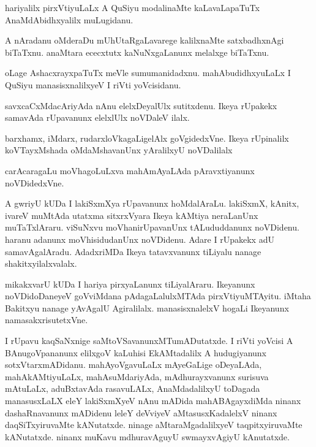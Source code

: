 \documentclass{article}
\begin{document}
\begin{mn}%
hariyalilx pirxVtiyuLaLx A QuSiyu modalinaMte kaLavaLapaTuTx AnaMdAbidhxyalilx muLugidanu.
\end{mn}

\begin{mn}%
A nAradanu oMderaDu mUhUtaRgaLavarege kalilxnaMte satxbadhxnAgi biTaTxnu. anaMtara 
ececxtutx kaNuNxgaLanunx melalxge biTaTxnu.
\end{mn}

\begin{mn}%
oLage AshacxrayxpaTuTx meVle sumumanidadxnu. mahAbudidhxyuLaLx I QuSiyu manasisxnalilxyeV I 
riVti yoVcisidanu.
\end{mn}

\begin{mn}%
savxcaCxMdacAriyAda nAnu elelxDeyalUlx sutitxdenu. Ikeya rUpakekx samavAda rUpavanunx 
elelxlUlx noVDaleV ilalx.
\end{mn}

\begin{mn}%
barxhamx, iMdarx, rudarxloVkagaLigelAlx goVgidedxVne. Ikeya rUpinalilx koVTayxMshada 
oMdaMshavanUnx yAralilxyU noVDalilalx
\end{mn}

\begin{mn}%
carAcaragaLu moVhagoLuLxva mahAmAyaLAda pAravxtiyanunx noVDidedxVne.
\end{mn}

\begin{mn}%
A gwriyU kUDa I lakiSxmXya rUpavanunx hoMdalAraLu. lakiSxmX, kAnitx, ivareV muMtAda 
utatxma sitxrxVyara Ikeya kAMtiya neraLanUnx muTaTxlAraru. viSuNxvu moVhanirUpavanUnx 
tALududdanunx noVDidenu. haranu adanunx moVhisidudanUnx noVDidenu. Adare I rUpakekx adU 
samavAgalAradu. AdadxriMDa Ikeya tatavxvanunx tiLiyalu nanage shakitxyilalxvalalx.
\end{mn}

\begin{mn}%
mikakxvarU kUDa I hariya pirxyaLanunx tiLiyalAraru. Ikeyanunx noVDidoDaneyeV goVviMdana 
pAdagaLalulxMTAda pirxVtiyuMTAyitu. iMtaha Bakitxyu nanage yAvAgalU Agiralilalx. 
manasisxnalelxV hogaLi Ikeyanunx namasakxrisutetxVne.
\end{mn}

\begin{mn}%
I rUpavu kaqSaNxnige saMtoVSavanunxMTumADutatxde. I riVti yoVcisi A BAnugoVpananunx 
elilxgoV kaLuhisi EkAMtadalilx A hudugiyanunx sotxVtarxmADidanu. mahAyoVgavuLaLx 
mAyeGaLige oDeyaLAda, mahAkAMtiyuLaLx, mahAsuMdariyAda, mAdhurayxvanunx surisuva mAtuLaLx, 
aduBxtavAda rasavuLALx, AnaMdadalilxyU  toDagada manasusxLaLX eleY lakiSxmXyeV
nAnu mADida mahABAgayxdiMda ninanx dashaRnavanunx mADidenu leleY deVviyeV aMtasusxKadalelxV 
ninanx daqSiTxyiruvaMte kANutatxde. ninage aMtaraMgadalilxyeV taqpitxyiruvaMte kANutatxde. 
ninanx muKavu mdhuravAguyU swmayxvAgiyU kAnutatxde.
\end{mn}
\end{document}
